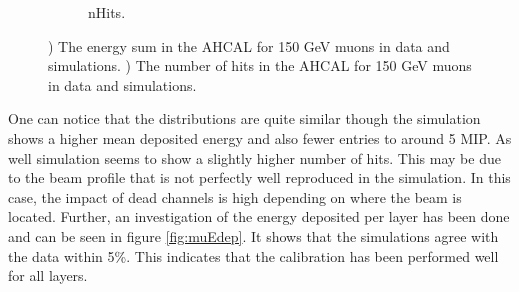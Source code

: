 \begin{figure}[htbp!]
\begin{subfigure}[t]{0.49\textwidth}
    \caption{nHits.} \label{fig:munHits}
  \end{subfigure}
  \caption{) The energy sum in the AHCAL for 150 GeV muons in data and simulations. ) The number of hits in the AHCAL for 150 GeV muons in data and simulations.}
  \label{fig:muVal}
\end{figure}

One can notice that the distributions are quite similar though the simulation shows a higher mean deposited energy and also fewer entries to around 5 MIP. As well simulation seems to show a slightly higher number of hits. This may be due to the beam profile that is not perfectly well reproduced in the simulation. In this case, the impact of dead channels is high depending on where the beam is located. Further, an investigation of the energy deposited per layer has been done and can be seen in figure \ref{fig:muEdep}. It shows that the simulations agree with the data within 5\%. This indicates that the calibration has been performed well for all layers.

